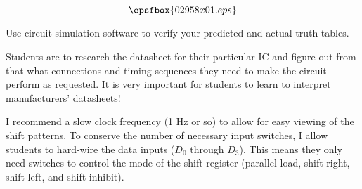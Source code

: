 

$$\epsfbox{02958x01.eps}$$

\vfil \eject






Use circuit simulation software to verify your predicted and actual truth tables.







Students are to research the datasheet for their particular IC and figure out from that what connections and timing sequences they need to make the circuit perform as requested.  It is very important for students to learn to interpret manufacturers' datasheets!

I recommend a slow clock frequency (1 Hz or so) to allow for easy viewing of the shift patterns.  To conserve the number of necessary input switches, I allow students to hard-wire the data inputs ($D_0$ through $D_3$).  This means they only need switches to control the mode of the shift register (parallel load, shift right, shift left, and shift inhibit).




